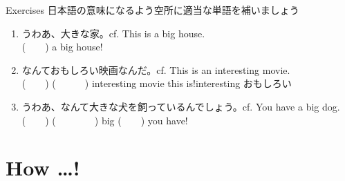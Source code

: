 \documentclass[aspectratio=169,xcolor={dvipsnames,table}]{beamer}
\begin{document}
\begin{frame}[plain]{Exercises}
日本語の意味になるよう空所に適当な単語を補いましょう
 \begin{enumerate}
  \item うわあ、大きな家。\hfill{\scriptsize cf. This is a big house.}\\
	(~~~~) a big house!
  \item なんておもしろい映画なんだ。\hfill{\scriptsize cf. This is an interesting movie.}\\
	(~~~~) (~~~~~~) interesting movie this is!\hfill{\scriptsize interesting  おもしろい}
  \item うわあ、なんて大きな犬を飼っているんでしょう。\hfill{\scriptsize cf. You have a big dog.}\\
	(~~~~) (~~~~~~~~) big (~~~~) you have!
 \end{enumerate}
\hfill{\scriptsize {}}

\end{frame}
\section{How \ldots ! }
\end{document}
